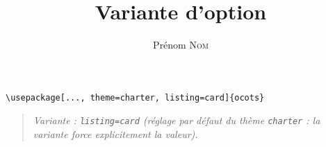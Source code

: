 \documentclass[11pt]{ocots-book}
\title{Variante d'option}
\author{Prénom \textsc{Nom}}
\newcommand{\ocotsvariantnote}[1]{\begin{quote}\itshape Variante : #1\end{quote}}
\begin{document}
\maketitle

\begin{lstlisting}
\usepackage[..., theme=charter, listing=card]{ocots}
\end{lstlisting}
\ocotsvariantnote{\texttt{listing=card} (r\'eglage par d\'efaut du th\`eme \texttt{charter} : la variante force explicitement la valeur).}

\end{document}
